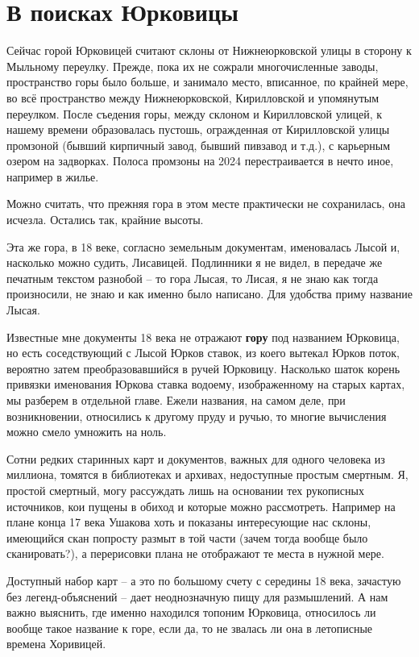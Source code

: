 \chapter{В поисках Юрковицы}

Сейчас горой Юрковицей считают склоны от Нижнеюрковской улицы в сторону к Мыльному переулку. Прежде, пока их не сожрали многочисленные заводы, пространство горы было больше, и занимало место, вписанное, по крайней мере, во всё пространство между Нижнеюрковской, Кирилловской и упомянутым переулком. После съедения горы, между склоном и Кирилловской улицей, к нашему времени образовалась пустошь, огражденная от Кирилловской улицы промзоной (бывший кирпичный завод, бывший пивзавод и т.д.), с карьерным озером на задворках. Полоса промзоны на 2024 перестраивается в нечто иное, например в жилье.

Можно считать, что прежняя гора в этом месте практически не сохранилась, она исчезла. Остались так, крайние высоты.

Эта же гора, в 18 веке, согласно земельным документам, именовалась Лысой и, насколько можно судить, Лисавицей. Подлинники я не видел, в передаче же печатным текстом разнобой – то гора Лысая, то Лисая, я не знаю как тогда произносили, не знаю и как именно было написано. Для удобства приму название Лысая.

Известные мне документы 18 века не отражают \textbf{гору} под названием Юрковица, но есть соседствующий с Лысой Юрков ставок, из коего вытекал Юрков поток, вероятно затем преобразовавшийся в ручей Юрковицу. Насколько шаток корень привязки именования Юркова ставка водоему, изображенному на старых картах, мы разберем в отдельной главе. Ежели названия, на самом деле, при возникновении, относились к другому пруду и ручью, то многие вычисления можно смело умножить на ноль.

Сотни редких старинных карт и документов, важных для одного человека из миллиона, томятся в библиотеках и архивах, недоступные простым смертным. Я, простой смертный, могу рассуждать лишь на основании тех рукописных источников, кои пущены в обиход и которые можно рассмотреть. Например на плане конца 17 века Ушакова хоть и показаны интересующие нас склоны, имеющийся скан попросту размыт в той части (зачем тогда вообще было сканировать?), а перерисовки плана не отображают те места в нужной мере.

Доступный набор карт – а это по большому счету с середины 18 века, зачастую без легенд-объяснений – дает неоднозначную пищу для размышлений. А нам важно выяснить, где именно находился топоним Юрковица, относилось ли вообще такое название к горе, если да, то не звалась ли она в летописные времена Хоривицей.

